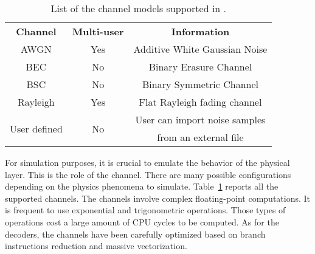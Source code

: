 \begin{table}[htp]
  \centering
  \caption{List of the channel models supported in \AFFECT.}
  \label{tab:aff3ct_features_channels}
  \begin{tabular}{ c | c | c }
  \multirow{2}{*}{\textbf{Channel}}      & \multirow{2}{*}{\textbf{Multi-user}} & \multirow{2}{*}{\textbf{Information}}          \\
                                         &                                      &                                                \\
  \hline
  \hline
  \multirow{2}{*}{{AWGN}}                & \multirow{2}{*}{Yes}                 & \multirow{2}{*}{Additive White Gaussian Noise} \\
                                         &                                      &                                                \\
  \hline
  \multirow{2}{*}{{BEC}}                 & \multirow{2}{*}{No}                  & \multirow{2}{*}{Binary Erasure Channel}        \\
                                         &                                      &                                                \\
  \hline
  \multirow{2}{*}{{BSC}}                 & \multirow{2}{*}{No}                  & \multirow{2}{*}{Binary Symmetric Channel}      \\
                                         &                                      &                                                \\
  \hline
  \multirow{2}{*}{{Rayleigh}}            & \multirow{2}{*}{Yes}                 & \multirow{2}{*}{Flat Rayleigh fading channel}  \\
                                         &                                      &                                                \\
  \hline
  \multirow{2}{*}{{User defined}}        & \multirow{2}{*}{No}                  & User can import noise samples                  \\
                                         &                                      & from an external file                          \\
  \end{tabular}
\end{table}

For simulation purposes, it is crucial to emulate the behavior of the physical
layer. This is the role of the channel. There are many possible configurations
depending on the physics phenomena to simulate.
Table~\ref{tab:aff3ct_features_channels} reports all the supported channels. The
channels involve complex floating-point computations. It is frequent to use
exponential and trigonometric operations. Those types of operations cost a large
amount of CPU cycles to be computed. As for the decoders, the channels have been
carefully optimized based on branch instructions reduction and massive
vectorization.

